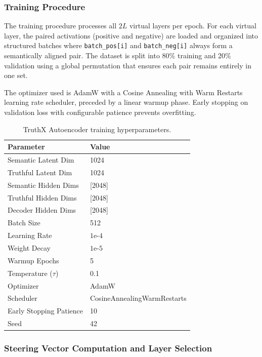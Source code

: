 \subsubsection{Training Procedure}

The training procedure processes all $2L$ virtual layers per epoch. For each virtual layer, the paired activations (positive and negative) are loaded and organized into structured batches where \texttt{batch\_pos[i]} and \texttt{batch\_neg[i]} always form a semantically aligned pair. The dataset is split into 80\% training and 20\% validation using a global permutation that ensures each pair remains entirely in one set.

The optimizer used is AdamW with a Cosine Annealing with Warm Restarts learning rate scheduler, preceded by a linear warmup phase. Early stopping on validation loss with configurable patience prevents overfitting.

\begin{table}[H]
\centering
\begin{tabularx}{\textwidth}{Xl}
    \toprule
    \textbf{Parameter} & \textbf{Value} \\
    \midrule
    Semantic Latent Dim & 1024 \\
    Truthful Latent Dim & 1024 \\
    Semantic Hidden Dims & [2048] \\
    Truthful Hidden Dims & [2048] \\
    Decoder Hidden Dims & [2048] \\
    Batch Size & 512 \\
    Learning Rate & $1\text{e-}4$ \\
    Weight Decay & $1\text{e-}5$ \\
    Warmup Epochs & 5 \\
    Temperature ($\tau$) & 0.1 \\
    Optimizer & AdamW \\
    Scheduler & CosineAnnealingWarmRestarts \\
    Early Stopping Patience & 10 \\
    Seed & 42 \\
    \bottomrule
\end{tabularx}
\caption{TruthX Autoencoder training hyperparameters.}
\label{tab:hyperparams-truthx-ae}
\end{table}

\subsubsection{Steering Vector Computation and Layer Selection}

